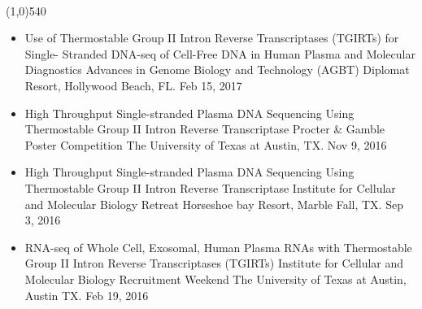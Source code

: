 \documentclass[dvips,11pt]{article}
\begin{document}
 \vspace{-1.5mm}
\\\noindent
\line(1,0){540}\\
\vspace{-6mm}
\begin{itemize}
	\setlength{\itemsep}{0pt}
	\item Use of Thermostable Group II Intron Reverse Transcriptases (TGIRTs) for Single- Stranded DNA-seq of Cell-Free DNA in Human Plasma and Molecular Diagnostics \newline
		Advances in Genome Biology and Technology (AGBT) \newline 
		Diplomat Resort, Hollywood Beach, FL. Feb 15, 2017
	\item High Throughput Single-stranded Plasma DNA Sequencing Using Thermostable Group II Intron Reverse Transcriptase \newline
	 	Procter \& Gamble Poster Competition \newline
		The University of Texas at Austin, TX. Nov 9, 2016
	\item High Throughput Single-stranded Plasma DNA Sequencing Using Thermostable Group II Intron Reverse Transcriptase \newline
		Institute for Cellular and Molecular Biology Retreat \newline
		Horseshoe bay Resort, Marble Fall, TX. Sep 3, 2016
	\item RNA-seq of Whole Cell, Exosomal, Human Plasma RNAs with Thermostable Group II Intron Reverse Transcriptases (TGIRTs) \newline
		Institute for Cellular and Molecular Biology Recruitment Weekend \newline
		The University of Texas at Austin, Austin TX. Feb 19, 2016
\end{itemize}


\end{document}
